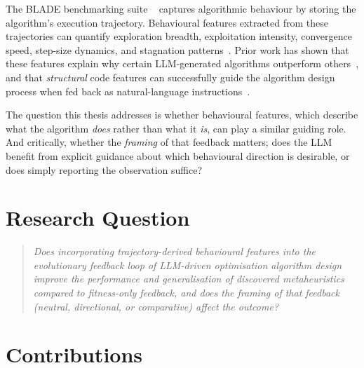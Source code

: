 The BLADE benchmarking suite ~\cite{vanStein2025BLADE} captures algorithmic behaviour by storing the algorithm's execution trajectory. Behavioural features extracted from these trajectories can quantify exploration breadth, exploitation intensity, convergence speed, step-size dynamics, and stagnation patterns~\cite{vanStein2025Behaviour}. Prior work has shown that these features explain why certain LLM-generated algorithms outperform others~\cite{vanStein2025Behaviour}, and that \emph{structural} code features can successfully guide the algorithm design process when fed back as natural-language instructions~\cite{vanStein2026LLaMEASAGE}.

The question this thesis addresses is whether behavioural features, which describe what the algorithm \emph{does} rather than what it \emph{is}, can play a similar guiding role. And critically, whether the \emph{framing} of that feedback matters; does the LLM benefit from explicit guidance about which behavioural direction is desirable, or does simply reporting the observation suffice?

\section{Research Question}
\label{sec:intro-rq}

\begin{quote}
\textit{Does incorporating trajectory-derived behavioural features into the evolutionary feedback loop of LLM-driven optimisation algorithm design improve the performance and generalisation of discovered metaheuristics compared to fitness-only feedback, and does the framing of that feedback (neutral, directional, or comparative) affect the outcome?}
\end{quote}

\section{Contributions}
\label{sec:intro-contributions}

